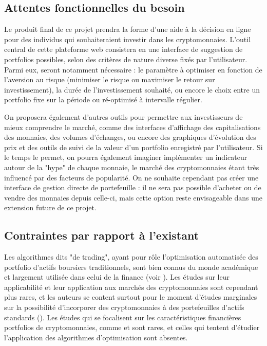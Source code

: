 \documentclass[a4paper]{article}
\begin{document}
\subsection{Attentes fonctionnelles du besoin}

Le produit final de ce projet prendra la forme d'une aide à la décision en ligne pour des individus qui souhaiteraient investir dans les cryptomonnaies. L'outil central de cette plateforme web consistera en une interface de suggestion de portfolios possibles, selon des critères de nature diverse fixés par l'utilisateur. Parmi eux, seront notamment nécessaire : le paramètre à optimiser en fonction de l'aversion au risque (minimiser le risque ou maximiser le retour sur investissement), la durée de l'investissement souhaité, ou encore le choix entre un portfolio fixe sur la période ou ré-optimisé à intervalle régulier.

On proposera également d'autres outils pour permettre aux investisseurs de mieux comprendre le marché, comme des interfaces d'affichage des capitalisations des monnaies, des volumes d'échanges, ou encore des graphiques d'évolution des prix et des outils de suivi de la valeur d'un portfolio enregistré par l'utilisateur. Si le temps le permet, on pourra également imaginer implémenter un indicateur autour de la "hype" de chaque monnaie, le marché des cryptomonnaies étant très influencé par des facteurs de popularité. On ne souhaite cependant pas créer une interface de gestion directe de portefeuille : il ne sera pas possible d'acheter ou de vendre des monnaies depuis celle-ci, mais cette option  reste envisageable dans une extension future de ce projet.

\subsection{Contraintes par rapport à l'existant}

Les algorithmes dits "de trading", ayant pour rôle l'optimisation automatisée des portfolio d'actifs boursiers traditionnels, sont bien connus du monde académique et largement utilisée dans celui de la finance (voir \cite{Li2014}). Les études sur leur applicabilité et leur application aux marchés des cryptomonnaies sont cependant plus rares, et les auteurs se content surtout pour le moment d'études marginales sur la possibilité d'incorporer des cryptomonnaies à des portefeuilles d'actifs standards (\cite{Elendner2018}). Les études qui se focalisent sur les caractéristiques financières portfolios de cryptomonnaies, comme \cite{KuoChuen17} et \cite{Chen2018} sont rares, et celles qui tentent d'étudier l'application des algorithmes d'optimisation sont absentes.
\end{document}
